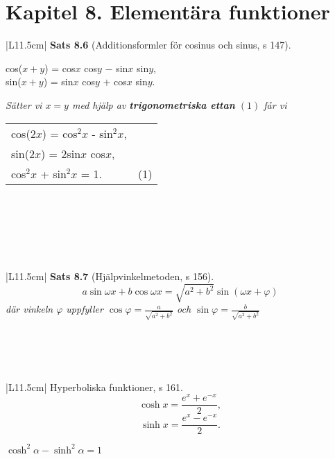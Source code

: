 \documentclass[a4paper]{article}
\begin{document}
\section*{Kapitel 8. Elementära funktioner}
\begin{tabular}{|L{11.5cm}|} \hline
\textbf{Sats 8.6} (Additionsformler för cosinus och sinus, s 147).
\begin{center}
cos($x+y$) = cos$x$ cos$y$ $-$ sin$x$ sin$y$, \\
sin($x+y$) = sin$x$ cos$y$ $+$ cos$x$ sin$y$.
\end{center}
\textit{Sätter vi $x=y$ med hjälp av \textbf{trigonometriska ettan} $(1)$ får vi}
\begin{center}
\begin{tabular}{lr}
cos($2x$) = cos$^2x$ - sin$^2x$,& \\
sin($2x$) = 2sin$x$ cos$x$, & \\
\vspace{0.1cm}
cos$^2x$ + sin$^2x$ = 1. & (1)
\end{tabular}
\end{center}
\\\hline
\end{tabular}
\\\\\\
\begin{tabular}{|L{11.5cm}|} \hline
\textbf{Sats 8.7} (Hjälpvinkelmetoden, s 156).
\begin{displaymath}
a \sin{\omega x}+b \cos{\omega x} = \sqrt{a^2+b^2} \sin{(\omega x + \varphi)}
\end{displaymath}
\textit{där vinkeln $\varphi$ uppfyller $\cos{\varphi} = \frac{a}{\sqrt{a^2+b^2}}$ och $\sin{\varphi} = \frac{b}{\sqrt{a^2+b^2}}$ }
\vspace{0.2cm}
\\\hline
\end{tabular}
\\\\\\
\begin{tabular}{|L{11.5cm}|} \hline
Hyperboliska funktioner, s 161.
\begin{displaymath}
\cosh x = \frac{e^x+e^{-x}}{2},
\end{displaymath}
\begin{displaymath}
\sinh x = \frac{e^x-e^{-x}}{2}.
\end{displaymath}
\begin{center}
$\cosh^2\alpha - \sinh^2\alpha = 1$
\end{center}
\\\hline
\end{tabular}
\end{document}

